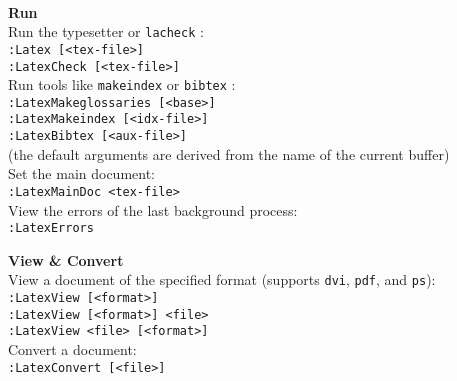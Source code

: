 \documentclass[oneside,10pt,landscape,DIV16]{scrartcl}
\begin{document}
\begin{multicols}{3}
\begin{center}
\begin{tabular}[]{|p{11mm}|p{62mm}|}
\hline
\end{tabular}\\[2.5ex]
%
\begin{minipage}[b]{70mm}%
\large{\textbf{Run}}\\[1.0ex]
Run the typesetter or \texttt{lacheck} : \\[1.0ex]
\texttt{:Latex [<tex-file>]} \\[1.0ex]
\texttt{:LatexCheck [<tex-file>]} \\[1.0ex]
Run tools like \texttt{makeindex} or \texttt{bibtex} : \\[1.0ex]
\texttt{:LatexMakeglossaries [<base>]} \\[1.0ex]
\texttt{:LatexMakeindex [<idx-file>]} \\[1.0ex]
\texttt{:LatexBibtex [<aux-file>]} \\[1.0ex]
(the default arguments are derived from the name of the current buffer) \\[1.0ex]
Set the main document: \\[1.0ex]
\texttt{:LatexMainDoc <tex-file>} \\[1.0ex]
View the errors of the last background process: \\[1.0ex]
\texttt{:LatexErrors}
\end{minipage}
%
%
\begin{minipage}[b]{70mm}%
\large{\textbf{View \& Convert}}\\[1.0ex]
View a document of the specified format
(supports \texttt{dvi}, \texttt{pdf}, and \texttt{ps}): \\[1.0ex]
\texttt{:LatexView [<format>]} \\[1.0ex]
\texttt{:LatexView [<format>] <file>} \\[1.0ex]
\texttt{:LatexView <file> [<format>]} \\[1.0ex]
Convert a document: \\[1.0ex]
\texttt{:LatexConvert [<file>]} \\[1.0ex]

\end{minipage}
\end{center}
\end{multicols}
\end{document}
